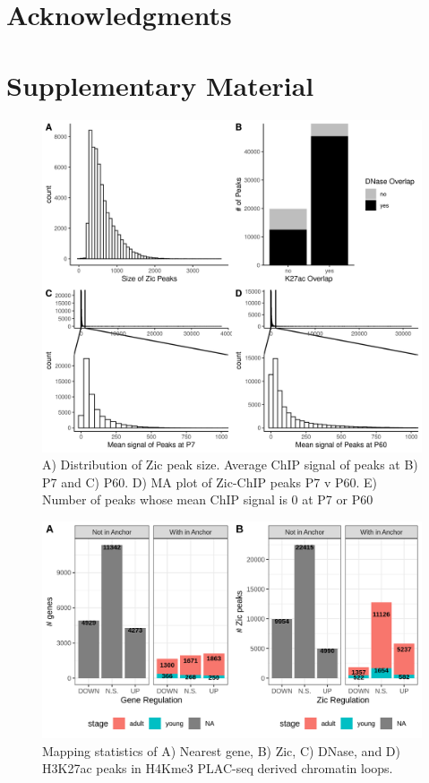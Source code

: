 \documentclass[fleqn,10pt,twocolumn]{wlscirep}
\begin{document}
\section*{Acknowledgments}





\clearpage


\beginsupplement
\section*{Supplementary Material}

\begin{figure}[ht]
\centering
\includegraphics[width=.90\linewidth]{../figures/supp_figure1.png}
\caption{A) Distribution of Zic peak size. Average ChIP signal of peaks at B) P7 and C) P60. D) MA plot of Zic-ChIP peaks P7 v P60. E) Number of peaks whose mean ChIP signal is 0 at P7 or P60}
\label{fig:ZicStats}
\end{figure}


\begin{figure}[ht]
\centering
\includegraphics[width=.90\linewidth]{../figures/supp_figure2.png}
\caption{Mapping statistics of A) Nearest gene, B) Zic, C) DNase, and D) H3K27ac peaks in H4Kme3 PLAC-seq derived chromatin loops.}
\label{fig:MappingStats}
\end{figure}
\end{document}
